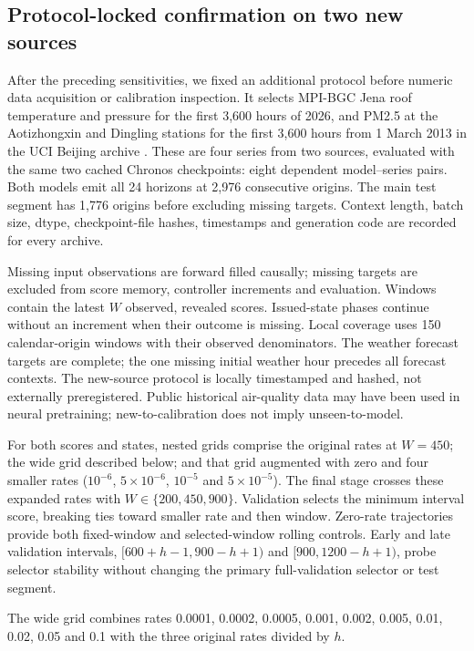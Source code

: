 \subsection{Protocol-locked confirmation on two new sources}\label{sec:newdesign}
After the preceding sensitivities, we fixed an additional protocol before numeric data
acquisition or calibration inspection. It selects MPI-BGC Jena roof temperature and
pressure for the first 3,600 hours of 2026, and PM2.5 at the Aotizhongxin and Dingling
stations for the first 3,600 hours from 1 March 2013 in the UCI Beijing archive
\citep{jena2026weather,chen2017air}. These are four series from two sources, evaluated
with the same two cached Chronos checkpoints: eight dependent model--series pairs.
Both models emit all 24 horizons at 2,976 consecutive origins. The main test segment
has 1,776 origins before excluding missing targets. Context length, batch size, dtype,
checkpoint-file hashes, timestamps and generation code are recorded for every archive.

Missing input observations are forward filled causally; missing targets are excluded
from score memory, controller increments and evaluation. Windows contain the latest
$W$ observed, revealed scores. Issued-state phases continue without an increment when
their outcome is missing. Local coverage uses 150 calendar-origin windows with their
observed denominators. The weather forecast targets are complete; the one missing
initial weather hour precedes all forecast contexts. The new-source protocol is locally
timestamped and hashed, not externally preregistered. Public historical air-quality data
may have been used in neural pretraining; new-to-calibration does not imply unseen-to-model.

For both scores and states, nested grids comprise the original rates at $W=450$;
the wide grid described below; and that grid augmented with zero
and four smaller rates ($10^{-6}$, $5\times10^{-6}$, $10^{-5}$ and $5\times10^{-5}$).
The final stage crosses these expanded rates with $W\in\{200,450,900\}$. Validation selects the minimum interval
score, breaking ties toward smaller rate and then window. Zero-rate trajectories
provide both fixed-window and selected-window rolling controls. Early and late
validation intervals, $[600+h-1,900-h+1)$ and $[900,1200-h+1)$, probe selector
stability without changing the primary full-validation selector or test segment.

The wide grid combines rates 0.0001, 0.0002, 0.0005, 0.001, 0.002, 0.005,
0.01, 0.02, 0.05 and 0.1 with the three original rates divided by $h$.

